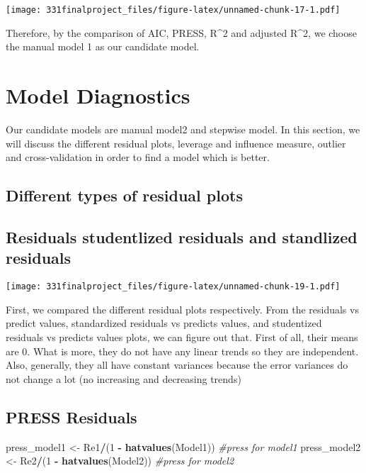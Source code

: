\documentclass[]{article}
\newenvironment{Shaded}{\begin{snugshade}}{\end{snugshade}}
\newcommand{\KeywordTok}[1]{\textcolor[rgb]{0.13,0.29,0.53}{\textbf{#1}}}
\newcommand{\DecValTok}[1]{\textcolor[rgb]{0.00,0.00,0.81}{#1}}
\newcommand{\StringTok}[1]{\textcolor[rgb]{0.31,0.60,0.02}{#1}}
\newcommand{\CommentTok}[1]{\textcolor[rgb]{0.56,0.35,0.01}{\textit{#1}}}
\newcommand{\OperatorTok}[1]{\textcolor[rgb]{0.81,0.36,0.00}{\textbf{#1}}}
\newcommand{\NormalTok}[1]{#1}
\begin{document}
\texttt{[image: 331finalproject\_files/figure-latex/unnamed-chunk-17-1.pdf]}

Therefore, by the comparison of AIC, PRESS, R\^{}2 and adjusted R\^{}2,
we choose the manual model 1 as our candidate model.

\section{Model Diagnostics}

Our candidate models are manual model2 and stepwise model. In this
section, we will discuss the different residual plots, leverage and
influence measure, outlier and cross-validation in order to find a model
which is better.

\subsection{Different types of residual plots}

\subsection{Residuals studentlized residuals and standlized
residuals}\label{residuals-studentlized-residuals-and-standlized-residuals}

\texttt{[image: 331finalproject\_files/figure-latex/unnamed-chunk-19-1.pdf]}

First, we compared the different residual plots respectively. From the
residuals vs predict values, standardized residuals vs predicts values,
and studentized residuals vs predicts values plots, we can figure out
that. First of all, their means are 0. What is more, they do not have
any linear trends so they are independent. Also, generally, they all
have constant variances because the error variances do not change a lot
(no increasing and decreasing trends)

\subsection{PRESS Residuals}\label{press-residuals}

\begin{Shaded}
\begin{Highlighting}[]
\NormalTok{press_model1 <-}\StringTok{ }\NormalTok{Re1}\OperatorTok{/}\NormalTok{(}\DecValTok{1} \OperatorTok{-}\StringTok{ }\KeywordTok{hatvalues}\NormalTok{(Model1)) }\CommentTok{#press for model1}
\NormalTok{press_model2 <-}\StringTok{ }\NormalTok{Re2}\OperatorTok{/}\NormalTok{(}\DecValTok{1} \OperatorTok{-}\StringTok{ }\KeywordTok{hatvalues}\NormalTok{(Model2)) }\CommentTok{#press for model2}
\end{Highlighting}
\end{Shaded}
\end{document}
